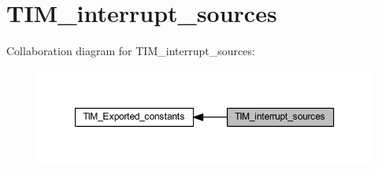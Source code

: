 \hypertarget{group___t_i_m__interrupt__sources}{}\section{T\+I\+M\+\_\+interrupt\+\_\+sources}
\label{group___t_i_m__interrupt__sources}
Collaboration diagram for T\+I\+M\+\_\+interrupt\+\_\+sources\+:\nopagebreak
\begin{figure}[H]
\begin{center}
\leavevmode
\includegraphics[width=350pt]{group___t_i_m__interrupt__sources}
\end{center}
\end{figure}

